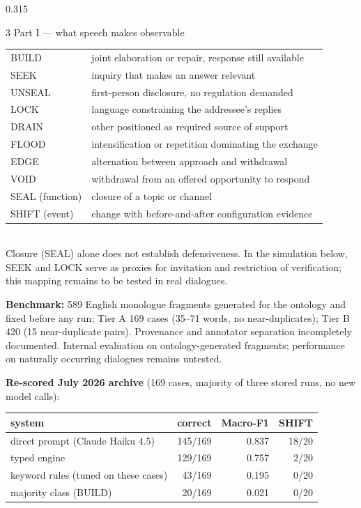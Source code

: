 \documentclass[final,t]{beamer}
\begin{document}
\begin{frame}[t]
\begin{columns}[t,totalwidth=0.965\paperwidth]
\begin{column}{0.315\textwidth}
\begin{block}{3 \; Part I --- what speech makes observable}
\smallskip
{\small
\begin{tabular}{@{}ll@{}}
BUILD & joint elaboration or repair, response still available\\
SEEK & inquiry that makes an answer relevant\\
UNSEAL & first-person disclosure, no regulation demanded\\
LOCK & language constraining the addressee's replies\\
DRAIN & other positioned as required source of support\\
FLOOD & intensification or repetition dominating the exchange\\
EDGE & alternation between approach and withdrawal\\
VOID & withdrawal from an offered opportunity to respond\\
SEAL (function) & closure of a topic or channel\\
SHIFT (event) & change with before-and-after configuration evidence\\
\end{tabular}}\\[0.15cm]
\small Closure (SEAL) alone does not establish defensiveness. In the simulation below, SEEK and LOCK serve as proxies for invitation and restriction of verification; this mapping remains to be tested in real dialogues.\normalsize

\medskip
\textbf{Benchmark:} 589 English monologue fragments generated for the ontology and fixed before any run; Tier A 169 cases (35--71 words, no near-duplicates); Tier B 420 (15 near-duplicate pairs). Provenance and annotator separation incompletely documented. Internal evaluation on ontology-generated fragments; performance on naturally occurring dialogues remains untested.

\medskip
\textbf{Re-scored July 2026 archive} (169 cases, majority of three stored runs, no new model calls):

\smallskip
{\small\begin{tabular}{@{}lrrr@{}}
\toprule
system & correct & Macro-F1 & SHIFT\\
\midrule
direct prompt (Claude Haiku 4.5) & 145/169 & 0.837 & 18/20\\
typed engine & 129/169 & 0.757 & 2/20\\
keyword rules (tuned on these cases) & 43/169 & 0.195 & 0/20\\
majority class (BUILD) & 20/169 & 0.021 & 0/20\\
\bottomrule
\end{tabular}}


\end{block}
\end{column}
\end{columns}
\end{frame}
\end{document}
